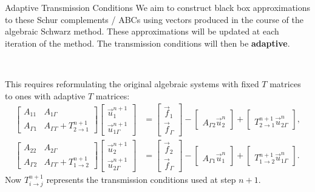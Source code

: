 \documentclass{beamer}
\begin{document}
\begin{frame}{Adaptive Transmission Conditions}
We aim to construct black box approximations to these Schur complements / ABCs using vectors produced in the course of the algebraic Schwarz method.
These approximations will be updated at each iteration of the method.
The transmission conditions will then be \textbf{adaptive}.

~

This requires reformulating the original algebraic systems with fixed $T$ matrices to ones with adaptive $T$ matrices:
\begin{align*}
\begin{bmatrix} A_{11} & A_{1 \Gamma} \\ A_{\Gamma 1} & A_{\Gamma \Gamma} + T_{2 \to 1}^{n+1} \end{bmatrix}
\begin{bmatrix} \vec{u}_1^{n+1} \\ \vec{u}_{1 \Gamma}^{n+1} \end{bmatrix}
& = \begin{bmatrix} \vec{f}_1 \\ \vec{f}_\Gamma \end{bmatrix}
- \begin{bmatrix} ~ \\ A_{\Gamma 2} \vec{u}_2^n \end{bmatrix}
+ \begin{bmatrix} ~ \\ T_{2 \to 1}^{n+1} \vec{u}_{2 \Gamma}^n \end{bmatrix}, \\
\begin{bmatrix} A_{22} & A_{2 \Gamma} \\ A_{\Gamma 2} & A_{\Gamma \Gamma} + T_{1 \to 2}^{n+1} \end{bmatrix}
\begin{bmatrix} \vec{u}_2^{n+1} \\ \vec{u}_{2 \Gamma}^{n+1} \end{bmatrix}
& = \begin{bmatrix} \vec{f}_2 \\ \vec{f}_\Gamma \end{bmatrix}
- \begin{bmatrix} ~ \\ A_{\Gamma 1} \vec{u}_1^n \end{bmatrix}
+ \begin{bmatrix} ~ \\ T_{1 \to 2}^{n+1} \vec{u}_{1 \Gamma}^n \end{bmatrix}.
\end{align*}
Now $T_{i \to j}^{n+1}$ represents the transmission conditions used at step $n+1$.
\end{frame}
\end{document}

